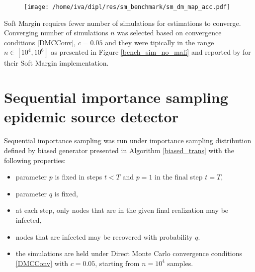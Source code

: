 \documentclass[times, utf8, diplomski]{fer}
\begin{document}
\begin{figure}[h]
\begin{minipage}{\textwidth}
\center
\texttt{[image: /home/iva/dipl/res/sm\_benchmark/sm\_dm\_map\_acc.pdf]}
\label{SM_MAP}
\end{minipage}
\end{figure}

Soft Margin requires fewer number of simulations for estimations to converge.
Converging number of simulations $n$ was selected based on  convergence conditions \ref{DMCConv}, $c=0.05$ and they were tipically in the range $n \in [10^4, 10^6]$ as presented in Figure \ref{bench_sim_no_mali} and reported by \citet{Nino} for their Soft Margin implementation. 

\section{Sequential importance sampling epidemic source detector}

Sequential importance sampling was run under importance sampling distribution defined by biased generator presented in Algorithm \ref{biased_trans} with the following properties:
\begin{itemize}
\item{parameter $p$ is fixed in steps $t<T$ and $p=1$ in the final step $t = T$,}
\item{parameter $q$ is fixed,}
\item{at each step, only nodes that are in the given final realization may be infected,}
\item{nodes that are infected may be recovered with probability $q$.}
\item{the simulations are held under  Direct Monte Carlo convergence conditions \ref{DMCConv} with $c = 0.05$, starting from $n = 10^4$ samples.}
\end{itemize}
\end{document}
